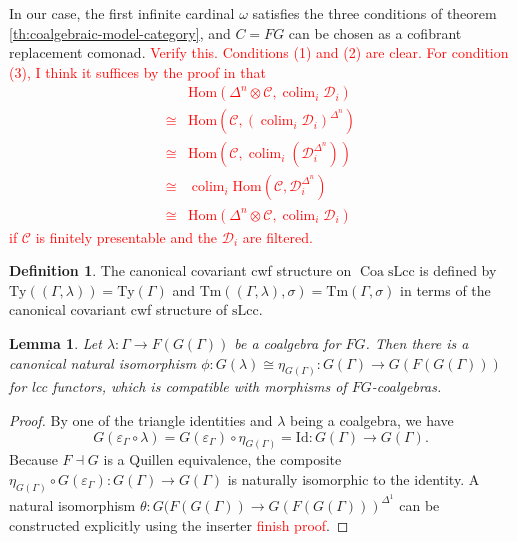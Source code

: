 \documentclass{article}
\newcommand{\todo}[1]{\textcolor{red}{#1}}
\newtheorem{lemma}{Lemma}
\theoremstyle{remark}
\theoremstyle{definition}
\newtheorem{definition}{Definition}
\begin{document}
In our case, the first infinite cardinal $\omega$ satisfies the three conditions of theorem \ref{th:coalgebraic-model-category}, and $C = FG$ can be chosen as a cofibrant replacement comonad.
\todo{
  Verify this.
  Conditions (1) and (2) are clear.
  For condition (3), I think it suffices by the proof in \cite{coalgebraic-models} that
  \begin{align}
    & \mathrm{Hom}(\Delta^n \otimes \mathcal{C}, \operatorname{colim}_i \mathcal{D}_i) \\
    \cong {} & \mathrm{Hom}(\mathcal{C}, (\operatorname{colim}_i \mathcal{D}_i)^{\Delta^n}) \\
    \cong {} & \mathrm{Hom}(\mathcal{C}, \operatorname{colim}_i (\mathcal{D}_i^{\Delta^n})) \\
    \cong {} & \operatorname{colim}_i \mathrm{Hom}(\mathcal{C}, \mathcal{D}_i^{\Delta^n}) \\
    \cong {} & \mathrm{Hom}(\Delta^n \otimes \mathcal{C}, \operatorname{colim}_i \mathcal{D}_i) 
  \end{align}
  if $\mathcal{C}$ is finitely presentable and the $\mathcal{D}_i$ are filtered.
}

\begin{definition}
  The canonical covariant cwf structure on $\operatorname{Coa} \mathrm{sLcc}$ is defined by $\mathrm{Ty}((\Gamma, \lambda)) = \mathrm{Ty}(\Gamma)$ and $\mathrm{Tm}((\Gamma, \lambda), \sigma) = \mathrm{Tm}(\Gamma, \sigma)$ in terms of the canonical covariant cwf structure of $\mathrm{sLcc}$.
\end{definition}

\begin{lemma}
  Let $\lambda : \Gamma \rightarrow F(G(\Gamma))$ be a coalgebra for $FG$.
  Then there is a canonical natural isomorphism $\phi : G(\lambda) \cong \eta_{G(\Gamma)} : G(\Gamma) \rightarrow G(F(G(\Gamma)))$ for lcc functors, which is compatible with morphisms of $FG$-coalgebras.
\end{lemma}
\begin{proof}
  By one of the triangle identities and $\lambda$ being a coalgebra, we have
  \begin{equation}
    G(\varepsilon_\Gamma \circ \lambda) = G(\varepsilon_\Gamma) \circ \eta_{G(\Gamma)} = \mathrm{Id} : G(\Gamma) \rightarrow G(\Gamma).
  \end{equation}
  Because $F \dashv G$ is a Quillen equivalence, the composite $\eta_{G(\Gamma)} \circ G(\varepsilon_\Gamma) : G(\Gamma) \rightarrow G(\Gamma)$ is naturally isomorphic to the identity.
  A natural isomorphism $\theta : G(F(G(\Gamma)) \rightarrow G(F(G(\Gamma)))^{\Delta^1}$ can be constructed explicitly using the inserter \todo{finish proof}.
\end{proof}
\end{document}
